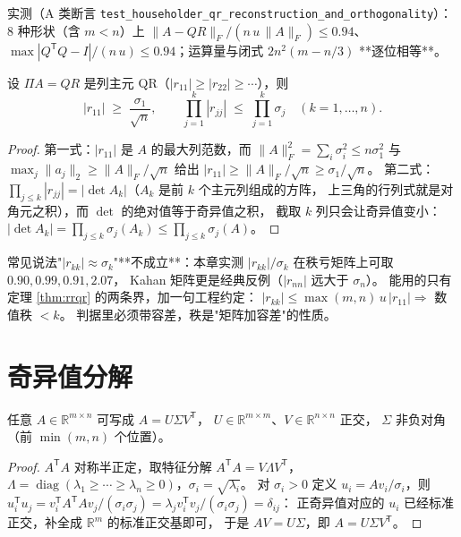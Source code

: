 实测（A 类断言 \texttt{test\_householder\_qr\_reconstruction\_and\_orthogonality}）：
8 种形状（含 $m<n$）上 $\|A-QR\|_F/(n\,u\,\|A\|_F)\le0.94$、
$\max|Q^{\mathsf T}Q-I|/(n\,u)\le0.94$；运算量与闭式 $2n^2(m-n/3)$ **逐位相等**。

\begin{theorem}
\label{thm:rrqr}
设 $\Pi A=QR$ 是列主元 QR（$|r_{11}|\ge|r_{22}|\ge\cdots$），则
\[
  |r_{11}|\;\ge\;\frac{\sigma_1}{\sqrt n},
  \qquad
  \prod_{j=1}^{k}|r_{jj}|\;\le\;\prod_{j=1}^{k}\sigma_j\quad(k=1,\dots,n).
\]
\end{theorem}

\begin{proof}
第一式：$|r_{11}|$ 是 $A$ 的最大列范数，而
$\|A\|_F^2=\sum_i\sigma_i^2\le n\sigma_1^2$ 与
$\max_j\|a_j\|_2\ge\|A\|_F/\sqrt n$ 给出 $|r_{11}|\ge\|A\|_F/\sqrt n\ge\sigma_1/\sqrt n$。
第二式：$\prod_{j\le k}|r_{jj}|=|\det A_k|$（$A_k$ 是前 $k$ 个主元列组成的方阵，
上三角的行列式就是对角元之积），而 $\det$ 的绝对值等于奇异值之积，
截取 $k$ 列只会让奇异值变小：$|\det A_k|=\prod_{j\le k}\sigma_j(A_k)\le\prod_{j\le k}\sigma_j(A)$。
\end{proof}

\begin{remark}
常见说法"$|r_{kk}|\approx\sigma_k$"**不成立**：本章实测
$|r_{kk}|/\sigma_k$ 在秩亏矩阵上可取 $0.90,0.99,0.91,2.07$，
Kahan 矩阵更是经典反例（$|r_{nn}|$ 远大于 $\sigma_n$）。
能用的只有定理 \ref{thm:rrqr} 的两条界，加一句工程约定：
$|r_{kk}|\le\max(m,n)\,u\,|r_{11}|\Rightarrow$ 数值秩 $<k$。
判据里必须带容差，秩是"矩阵加容差"的性质。
\end{remark}

\section{奇异值分解}

\begin{theorem}
\label{thm:svd}
任意 $A\in\mathbb{R}^{m\times n}$ 可写成 $A=U\Sigma V^{\mathsf T}$，
$U\in\mathbb{R}^{m\times m}$、$V\in\mathbb{R}^{n\times n}$ 正交，
$\Sigma$ 非负对角（前 $\min(m,n)$ 个位置）。
\end{theorem}

\begin{proof}
$A^{\mathsf T}A$ 对称半正定，取特征分解 $A^{\mathsf T}A=V\Lambda V^{\mathsf T}$，
$\Lambda=\operatorname{diag}(\lambda_1\ge\cdots\ge\lambda_n\ge0)$，$\sigma_i=\sqrt{\lambda_i}$。
对 $\sigma_i>0$ 定义 $u_i=Av_i/\sigma_i$，则
$u_i^{\mathsf T}u_j=v_i^{\mathsf T}A^{\mathsf T}Av_j/(\sigma_i\sigma_j)
=\lambda_jv_i^{\mathsf T}v_j/(\sigma_i\sigma_j)=\delta_{ij}$：
正奇异值对应的 $u_i$ 已经标准正交，补全成 $\mathbb{R}^m$ 的标准正交基即可，
于是 $AV=U\Sigma$，即 $A=U\Sigma V^{\mathsf T}$。
\end{proof}

